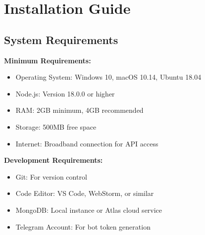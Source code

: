 \documentclass[12pt]{article}
\begin{document}
\appendix

\section{Installation Guide}

\subsection{System Requirements}
\textbf{Minimum Requirements:}
\begin{itemize}
    \item Operating System: Windows 10, macOS 10.14, Ubuntu 18.04
    \item Node.js: Version 18.0.0 or higher
    \item RAM: 2GB minimum, 4GB recommended
    \item Storage: 500MB free space
    \item Internet: Broadband connection for API access
\end{itemize}
\textbf{Development Requirements:}
\begin{itemize}
    \item Git: For version control
    \item Code Editor: VS Code, WebStorm, or similar
    \item MongoDB: Local instance or Atlas cloud service
    \item Telegram Account: For bot token generation
\end{itemize}
\end{document}
